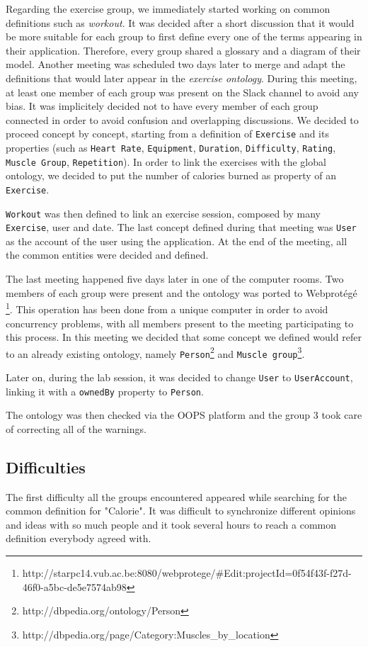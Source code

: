 \documentclass[a4paper]{article}
\begin{document}
Regarding the exercise group, we immediately started working on common definitions such as \textit{workout}. It was decided after a short discussion that it would be more suitable for each group to first define every one of the terms appearing in their application.  Therefore, every group shared a glossary and a diagram of their model. Another meeting was scheduled two days later to merge and adapt the definitions that would later appear in the \textit{exercise ontology}. 
During this meeting, at least one member of each group was present on the Slack channel to avoid any bias. It was implicitely decided not to have every member of each group connected in order to avoid confusion and overlapping discussions. 
We decided to proceed concept by concept, starting from a definition of \texttt{Exercise} and its properties (such as \texttt{Heart Rate}, \texttt{Equipment}, \texttt{Duration}, \texttt{Difficulty}, \texttt{Rating}, \texttt{Muscle Group}, \texttt{Repetition}).
In order to link the exercises with the global ontology, we decided to put the number of calories burned as property of an \texttt{Exercise}.

\texttt{Workout} was then defined to link an exercise session, composed by many \texttt{Exercise}, user and date.
The last concept defined during that meeting was \texttt{User} as the account of the user using the application.
At the end of the meeting, all the common entities were decided and defined.

The last meeting happened five days later in one of the computer rooms. Two members of each group were present and the ontology was ported to Webprotégé \footnote{http://starpc14.vub.ac.be:8080/webprotege/\#Edit:projectId=0f54f43f-f27d-46f0-a5bc-de5e7574ab98}. 
This operation has been done from a unique computer in order to avoid concurrency problems, with all members present to the meeting participating to this process.
In this meeting we decided that some concept we defined would refer to an already existing ontology, namely \texttt{Person}\footnote{http://dbpedia.org/ontology/Person} and \texttt{Muscle group}\footnote{http://dbpedia.org/page/Category:Muscles\_by\_location}.

Later on, during the lab session, it was decided to change \texttt{User} to \texttt{UserAccount}, linking it with a \texttt{ownedBy} property to \texttt{Person}.

The ontology was then checked via the OOPS platform and the group 3 took care of correcting all of the warnings. 

\subsection{Difficulties}
The first difficulty all the groups encountered appeared while searching for the common definition for "Calorie". It was difficult to synchronize different opinions and ideas with so much people and it took several hours to reach a common definition everybody agreed with.
\end{document}

